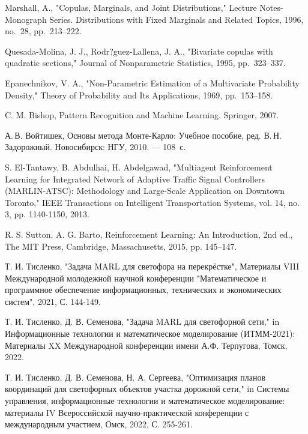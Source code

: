 \documentclass[11pt]{ubs}
\begin{document}
\begin{thebibliography}{10}
   Marshall, A., "Copulas, Marginals, and Joint Distributions," {Lecture Notes-Monograph Series. Distributions with Fixed Marginals and Related Topics}, 1996, no.~28, pp.~213--222.

   Quesada-Molina, J. J., Rodr?guez-Lallena, J. A., "Bivariate copulas with quadratic sections," {Journal of Nonparametric Statistics}, 1995, pp.~323--337.

   Epanechnikov, V. A., "Non-Parametric Estimation of a Multivariate Probability Density," {Theory of Probability and Its Applications}, 1969, pp.~153--158.

  C. M. Bishop, {Pattern Recognition and Machine Learning}. Springer, 2007.

   А.\,В. Войтишек, {Основы метода Монте-Карло: Учебное пособие}, ред. В.\,Н. Задорожный. Новосибирск: НГУ, 2010. — 108~с.




   S. El-Tantawy, B. Abdulhai, H. Abdelgawad, "Multiagent Reinforcement Learning for Integrated Network of Adaptive Traffic Signal Controllers (MARLIN-ATSC): Methodology and Large-Scale Application on Downtown Toronto," {IEEE Transactions on Intelligent Transportation Systems}, vol. 14, no. 3, pp. 1140-1150, 2013.


   R. S. Sutton, A. G. Barto, {Reinforcement Learning: An Introduction}, 2nd ed., The MIT Press, Cambridge, Massachusetts, 2015, pp. 145–147.

   Т. И. Тисленко, "Задача MARL для светофора на перекрёстке",  Материалы VIII Международной молодежной научной конференции "Математическое и программное обеспечение информационных, технических и экономических систем", 2021, С. 144-149.

   Т. И. Тисленко, Д. В. Семенова, "Задача MARL для светофорной сети," in {Информационные технологии и математическое моделирование (ИТММ-2021): Материалы XX Международной конференции имени А.Ф. Терпугова}, Томск, 2022.

   Т. И. Тисленко, Д. В. Семенова, Н. А. Сергеева, "Оптимизация планов координаций для светофорных объектов участка дорожной сети," in {Системы управления, информационные технологии и математическое моделирование: материалы IV Всероссийской научно-практической конференции с международным участием}, Омск, 2022, С. 255-261.




\end{thebibliography}

\newpage
\makeenginfo
\makeauxinfo
\end{document}

